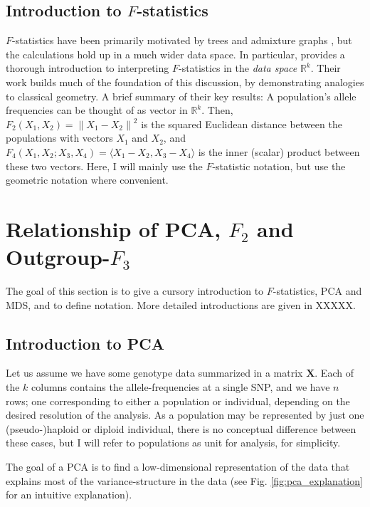 \documentclass[10pt,a4paper]{article}
\newcommand{\normsq}[1]{\left\lVert#1\right\rVert^2}
\newcommand{\MX}{\mathbf{X}} %
\begin{document}
\subsection{Introduction to $F$-statistics}
$F$-statistics have been primarily motivated by trees and admixture graphs \citep{patterson2012, peter2016}, but the calculations hold up in a much wider data space. In particular,  \cite{oteo-garcia2021} provides a thorough introduction to interpreting $F$-statistics in the \emph{data space} $\mathbb{R}^k$. Their work builds much of the foundation of this discussion, by demonstrating analogies to classical geometry. A brief summary of their key results: A population's allele frequencies can be thought of as vector in $\mathbb{R}^k$. Then, $F_2(X_1, X_2) = \normsq{X_1 - X_2}$ is the squared Euclidean distance between the populations with vectors $X_1$ and $X_2$, and $F_4(X_1, X_2 ; X_3, X_4) = \langle X_1 - X_2, X_3 - X_4 \rangle$ is the inner (scalar) product between these two vectors. Here, I will mainly use the $F$-statistic notation, but use the geometric notation where convenient.



	
\section{Relationship of PCA, $F_2$ and Outgroup-$F_3$}

The goal of this section is to give a cursory introduction to $F$-statistics, PCA and MDS, and to define notation. More detailed introductions are given in XXXXX.

\subsection{Introduction to PCA}
	Let us assume we have some genotype data summarized in a matrix $\MX$. Each of the $k$ columns contains the allele-frequencies at a single SNP, and we have $n$ rows; one corresponding to either a population or individual, depending on the desired resolution of the analysis. As a population may be represented by just one (pseudo-)haploid or diploid individual, there is no conceptual difference between these cases, but I will refer to populations as unit for analysis, for simplicity. 
	
	The goal of a PCA is to find a low-dimensional representation of the data that explains most of the variance-structure in the data (see Fig. \ref{fig:pca_explanation} for an intuitive explanation). 
	
\end{document}
